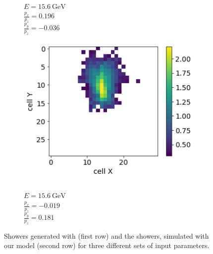 \begin{figure}
\begin{subfigure}{0.24\textwidth}
    \caption{\\$E = 15.6~\text{GeV}$ \\ $\frac{p_x}{p_z}=0.196$ \\ $\frac{p_y}{p_z}=-0.036$}%
  \end{subfigure}
  \begin{subfigure}{0.24\textwidth}
    \centering
    \includegraphics[width=1\textwidth]{figures/4_gen.png}
    \caption{\\$E = 15.6~\text{GeV}$ \\  $\frac{p_x}{p_z}=-0.019$ \\ $\frac{p_y}{p_z}=0.181$}%
  \end{subfigure}
 
  \caption{Showers generated with \geant (first row) and the showers, simulated with our model (second row) for three different sets of input parameters. }
  \label{fig:geant_vs_ours}
\end{figure}

